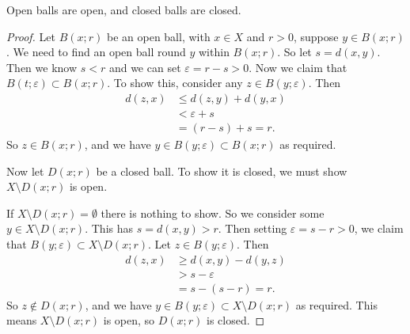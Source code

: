 \documentclass[10pt, a4paper]{article}
\begin{document}
\begin{proposition}
    Open balls are open,
    and closed balls are closed.

    \begin{proof}
        Let $B(x; r)$ be an open ball,
        with $x \in X$ and $r > 0$,
        suppose $y \in B(x; r)$.
        We need to find an open ball round $y$ within $B(x; r)$.
        So let $s = d(x, y)$.
        Then we know $s < r$ and we can set $\varepsilon = r - s > 0$.
        Now we claim that $B(t; \varepsilon) \subset B(x; r)$.
        To show this,
        consider any $z \in B(y; \varepsilon)$.
        Then
        \begin{align*}
            d(z, x) &\leq d(z, y) + d(y, x) \\
            &< \varepsilon + s \\
            &= (r - s) + s = r.
        \end{align*}
        So $z \in B(x; r)$,
        and we have $y \in B(y; \varepsilon) \subset B(x; r)$ as required.

        Now let $D(x; r)$ be a closed ball.
        To show it is closed,
        we must show $X \setminus D(x; r)$ is open.

        If $X \setminus D(x; r) = \emptyset$ there is nothing to show.
        So we consider some $y \in X \setminus D(x; r)$.
        This has $s = d(x, y) > r$.
        Then setting $\varepsilon = s - r > 0$,
        we claim that $B(y; \varepsilon) \subset X \setminus D(x; r)$.
        Let $z \in B(y; \varepsilon)$.
        Then
        \begin{align*}
            d(z, x) &\geq d(x, y) - d(y, z) \\
            &> s - \varepsilon \\
            &= s - (s - r) = r.
        \end{align*}
        So $z \notin D(x; r)$,
        and we have $y \in B(y; \varepsilon) \subset X \setminus D(x; r)$ as required.
        This means $X \setminus D(x; r)$ is open,
        so $D(x; r)$ is closed.
    \end{proof}
\end{proposition}
\end{document}

